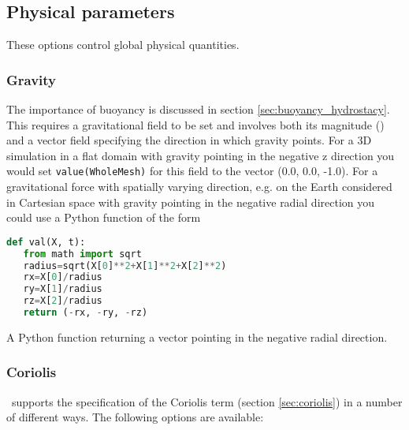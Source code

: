 \subsection{Physical parameters}
These options control global physical quantities.

\subsubsection{Gravity}\label{sec:Gravity}
The importance of buoyancy is discussed in section \ref{sec:buoyancy_hydrostacy}. This
requires a gravitational field to be set and involves both its magnitude
(\eg \mss[9.8]) and a vector field specifying the direction in which gravity
points. For a 3D simulation in a flat domain with gravity pointing in the
negative z direction you would set \verb+value(WholeMesh)+ for this field to
the vector (0.0, 0.0, -1.0). For a gravitational force with spatially
varying direction, e.g. on the Earth considered in Cartesian space with
gravity pointing in the negative radial direction you could use a Python
function of the form
\begin{example}
  \begin{lstlisting}[language=Python]
def val(X, t):
   from math import sqrt
   radius=sqrt(X[0]**2+X[1]**2+X[2]**2)
   rx=X[0]/radius
   ry=X[1]/radius
   rz=X[2]/radius
   return (-rx, -ry, -rz)
  \end{lstlisting}
  \caption{A Python function returning a vector pointing in the negative radial direction.}
\end{example}

\subsubsection{Coriolis}

\fluidity\ supports the specification of the Coriolis term (section
\ref{sec:coriolis}) in a number of different ways. The following options
are available:

